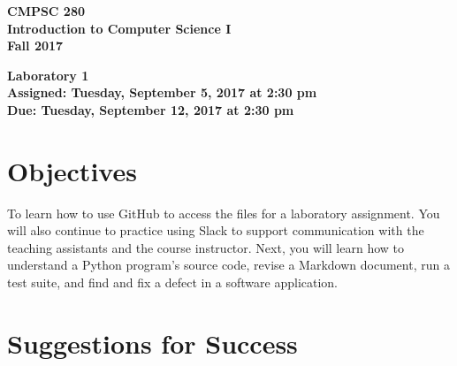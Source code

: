\documentclass[11pt]{article}
\newcommand{\assignmentduedate}{September 12}
\newcommand{\assignmentassignedate}{September 5}
\newcommand{\labyear}{2017}
\newcommand{\labday}{Tuesday}
\newcommand{\labtime}{2:30 pm}
\newcommand{\assigneddate}{Assigned: \labday, \assignmentassignedate, \labyear{} at \labtime{}}
\newcommand{\duedate}{Due: \labday, \assignmentduedate, \labyear{} at \labtime{}}
\newcommand{\labtitle}[1]
{
  \begin{center}
    \begin{center}
      \bf
      CMPSC 280\\Introduction to Computer Science I\\
      Fall 2017\\
      \medskip
    \end{center}
    \bf
    #1
  \end{center}
}
\begin{document}
\thispagestyle{empty}

\labtitle{Laboratory 1 \\ \assigneddate{} \\ \duedate{}}

\section*{Objectives}

To learn how to use GitHub to access the files for a laboratory assignment. You will also continue to practice using
Slack to support communication with the teaching assistants and the course instructor. Next, you will learn how to
understand a Python program's source code, revise a Markdown document, run a test suite, and find and fix a defect in a
software application.

\section*{Suggestions for Success}
\end{document}
